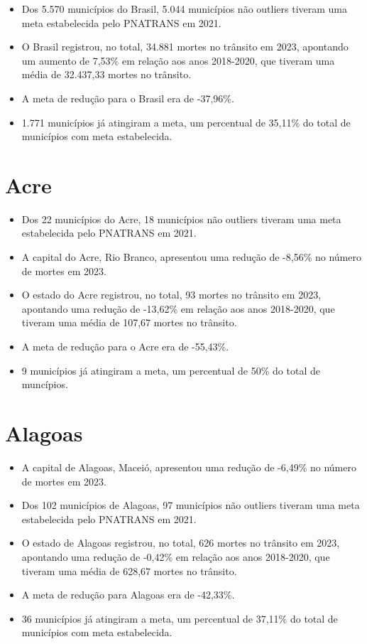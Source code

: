 \documentclass[
  letterpaper,
  DIV=11,
  numbers=noendperiod]{scrreprt}
\begin{document}
\begin{itemize}
\item
  Dos 5.570 municípios do Brasil, 5.044 municípios não outliers tiveram
  uma meta estabelecida pelo PNATRANS em 2021.
\item
  O Brasil registrou, no total, 34.881 mortes no trânsito em 2023,
  apontando um aumento de 7,53\% em relação aos anos 2018-2020, que
  tiveram uma média de 32.437,33 mortes no trânsito.
\item
  A meta de redução para o Brasil era de -37,96\%.
\item
  1.771 municípios já atingiram a meta, um percentual de 35,11\% do
  total de municípios com meta estabelecida.
\end{itemize}

\section{Acre}\label{acre}

\begin{itemize}
\item
  Dos 22 municípios do Acre, 18 municípios não outliers tiveram uma meta
  estabelecida pelo PNATRANS em 2021.
\item
  A capital do Acre, Rio Branco, apresentou uma redução de -8,56\% no
  número de mortes em 2023.
\item
  O estado do Acre registrou, no total, 93 mortes no trânsito em 2023,
  apontando uma redução de -13,62\% em relação aos anos 2018-2020, que
  tiveram uma média de 107,67 mortes no trânsito.
\item
  A meta de redução para o Acre era de -55,43\%.
\item
  9 municípios já atingiram a meta, um percentual de 50\% do total de
  muncípios.
\end{itemize}

\section{Alagoas}\label{alagoas}

\begin{itemize}
\item
  A capital de Alagoas, Maceió, apresentou uma redução de -6,49\% no
  número de mortes em 2023.
\item
  Dos 102 municípios de Alagoas, 97 municípios não outliers tiveram uma
  meta estabelecida pelo PNATRANS em 2021.
\item
  O estado de Alagoas registrou, no total, 626 mortes no trânsito em
  2023, apontando uma redução de -0,42\% em relação aos anos 2018-2020,
  que tiveram uma média de 628,67 mortes no trânsito.
\item
  A meta de redução para Alagoas era de -42,33\%.
\item
  36 municípios já atingiram a meta, um percentual de 37,11\% do total
  de municípios com meta estabelecida.
\end{itemize}
\end{document}
